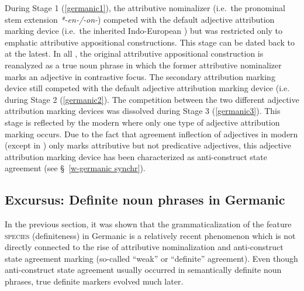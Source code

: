 {During Stage 1 (\ref{germanic1}), the attributive nominalizer (i.e.~the pronominal stem extension \textit{*-en-/-on-}) competed with the default adjective attribution marking device (i.e.~the inherited Indo-European ) but was restricted only to emphatic attributive appositional constructions. This stage can be dated back to  at the latest. In all , the original attributive appositional construction is reanalyzed as a true noun phrase in which the former attributive nominalizer marks an adjective in contrastive focus. The secondary attribution marking device still competed with the default adjective attribution marking device (i.e.~ during Stage 2 (\ref{germanic2}). The competition between the two different adjective attribution marking devices was dissolved during Stage 3 (\ref{germanic3}). This stage is reflected by the modern  where only one type of adjective attribution marking occurs. Due to the fact that agreement inflection of adjectives in modern  (except in ) only marks attributive but not predicative adjectives, this adjective attribution marking device has been characterized as anti\hyp{}construct state agreement (see \S~\ref{w-germanic synchr}).

\subsection[Definite noun phrases in Germanic]{Excursus: Definite noun phrases in Germanic}
In the previous section, it was shown that the grammaticalization of the feature \textsc{species} (definiteness) in Germanic is a relatively recent phenomenon which is not directly connected to the rise of attributive nominalization and anti\hyp{}construct state agreement marking (so-called “weak” or “definite” agreement). Even though anti\hyp{}construct state agreement usually occurred in semantically definite noun phrases, true definite markers evolved much later.

}
